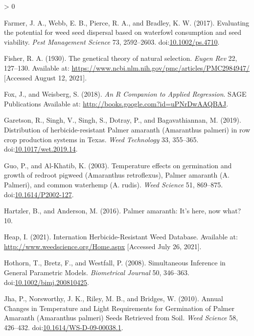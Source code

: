 \documentclass[utf8]{frontiersSCNS}
\newlength{\cslhangindent}
\newenvironment{CSLReferences}[2] %
 {%
  \setlength{\parindent}{0pt}
  \ifodd #1 \everypar{\setlength{\hangindent}{\cslhangindent}}\ignorespaces\fi
  \ifnum #2 > 0
  \setlength{\parskip}{#2\baselineskip}
  \fi
 }%
 {}
\begin{document}
\begin{CSLReferences}{1}{0}
\leavevmode\hypertarget{ref-farmer2017}{}%
Farmer, J. A., Webb, E. B., Pierce, R. A., and Bradley, K. W. (2017).
Evaluating the potential for weed seed dispersal based on waterfowl
consumption and seed viability. \emph{Pest Management Science} 73,
2592--2603. doi:\href{https://doi.org/10.1002/ps.4710}{10.1002/ps.4710}.

\leavevmode\hypertarget{ref-fisher1930}{}%
Fisher, R. A. (1930). The genetical theory of natural selection.
\emph{Eugen Rev} 22, 127--130. Available at:
\url{https://www.ncbi.nlm.nih.gov/pmc/articles/PMC2984947/} {[}Accessed
August 12, 2021{]}.

\leavevmode\hypertarget{ref-fox2018}{}%
Fox, J., and Weisberg, S. (2018). \emph{An {R Companion} to {Applied
Regression}}. {SAGE Publications} Available at:
\url{http://books.google.com?id=uPNrDwAAQBAJ}.

\leavevmode\hypertarget{ref-garetson2019}{}%
Garetson, R., Singh, V., Singh, S., Dotray, P., and Bagavathiannan, M.
(2019). Distribution of herbicide-resistant {Palmer} amaranth
({Amaranthus} palmeri) in row crop production systems in {Texas}.
\emph{Weed Technology} 33, 355--365.
doi:\href{https://doi.org/10.1017/wet.2019.14}{10.1017/wet.2019.14}.

\leavevmode\hypertarget{ref-guo2003}{}%
Guo, P., and Al-Khatib, K. (2003). Temperature effects on germination
and growth of redroot pigweed ({Amaranthus} retroflexus), {Palmer}
amaranth ({A}. Palmeri), and common waterhemp ({A}. rudis). \emph{Weed
Science} 51, 869--875.
doi:\href{https://doi.org/10.1614/P2002-127}{10.1614/P2002-127}.

\leavevmode\hypertarget{ref-hartzler2016}{}%
Hartzler, B., and Anderson, M. (2016). Palmer amaranth: {It}'s here, now
what? 10.

\leavevmode\hypertarget{ref-heap2021}{}%
Heap, I. (2021). Internation {Herbicide}-{Resistant Weed Database}.
Available at: \url{http://www.weedscience.org/Home.aspx} {[}Accessed
July 26, 2021{]}.

\leavevmode\hypertarget{ref-hothorn2008}{}%
Hothorn, T., Bretz, F., and Westfall, P. (2008). Simultaneous
{Inference} in {General Parametric Models}. \emph{Biometrical Journal}
50, 346--363.
doi:\href{https://doi.org/10.1002/bimj.200810425}{10.1002/bimj.200810425}.

\leavevmode\hypertarget{ref-jha2010}{}%
Jha, P., Norsworthy, J. K., Riley, M. B., and Bridges, W. (2010). Annual
{Changes} in {Temperature} and {Light Requirements} for {Germination} of
{Palmer Amaranth} ({Amaranthus} palmeri) {Seeds Retrieved} from {Soil}.
\emph{Weed Science} 58, 426--432.
doi:\href{https://doi.org/10.1614/WS-D-09-00038.1}{10.1614/WS-D-09-00038.1}.


\end{CSLReferences}
\end{document}
